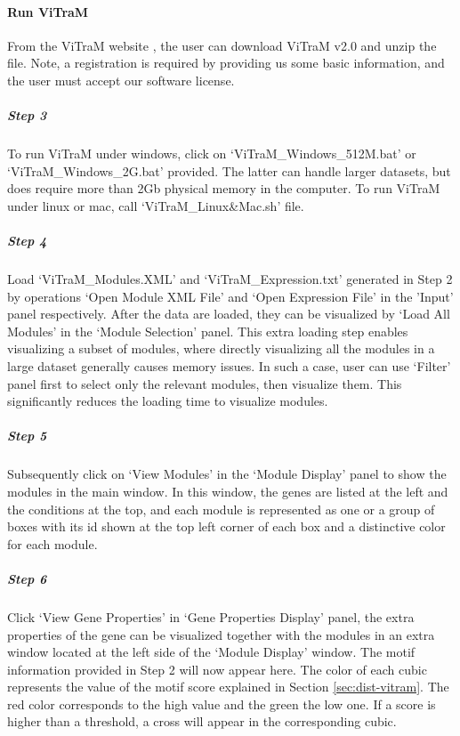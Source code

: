 \paragraph{Run ViTraM}

From the ViTraM website \cite{ViTraM}, the user can  download ViTraM v2.0 and unzip the file. Note, a registration is required by  providing us some basic information, and the user must accept our software  license.

\begin{small} %

\subparagraph{Step 3} To run ViTraM under windows, click on  `ViTraM\_Windows\_512M.bat' or `ViTraM\_Windows\_2G.bat' provided.  The latter can handle larger datasets, but does require more than 2Gb physical memory in the computer. To run ViTraM under linux or mac, call `ViTraM\_Linux\&Mac.sh' file.

\subparagraph{Step 4} Load `ViTraM\_Modules.XML' and `ViTraM\_Expression.txt'  generated in Step 2 by operations `Open Module XML File' and `Open Expression File' in the 'Input' panel respectively.  After the data are loaded, they can be visualized by `Load All Modules' in the `Module Selection' panel.  This extra loading step enables visualizing a subset of modules, where directly visualizing all the modules in a large dataset generally causes memory issues. In such a case, user can use `Filter' panel first to select only the relevant modules, then visualize them. This significantly reduces the loading time to visualize modules.

\subparagraph{Step 5} Subsequently click on `View Modules' in the  `Module Display' panel to show the modules in the main window.  In this window, the genes are listed at the left and the conditions at the top, and each module is represented as one or a group of boxes with its id shown at the top left corner of each box and a distinctive color for each module.

\subparagraph{Step 6} Click `View Gene Properties' in `Gene Properties  Display' panel, the extra properties of the gene can be visualized together with the modules in an extra window located at the left side of the `Module Display' window.  The motif information provided in Step 2 will now appear here. The color of each cubic represents the value of the motif score explained in Section \ref{sec:dist-vitram}.  The red color corresponds to the high value and the green the low one. If a score is higher than a threshold, a cross will appear in the corresponding cubic.



\end{small}
